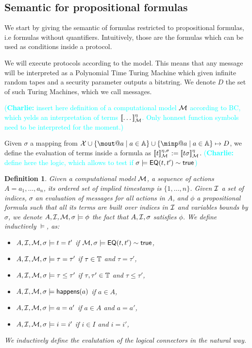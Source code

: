 \documentclass[a4paper]{article}
\newtheorem{definition}{Definition}
\theoremstyle{remark}
\newcommand{\charlie}[1]{\textcolor{cyan}{(\textbf{Charlie:} #1)}}
\begin{document}
\subsection{Semantic for propositional formulas}
We start by giving the semantic of formulas restricted to propositional formulas, i.e formulas without quantifiers. Intuitively, those are the formulas which can be used as conditions inside a protocol.

We will execute protocols according to the \BC model. This means that any message will be interpreted as a Polynomial Time Turing Machine which given infinite random tapes and a security parameter outputs a bitstring. We denote $D$ the set of such Turing Machines, which we call messages.

\charlie{insert here definition of a computational model $\mathcal{M}$ according to BC, which yelds an interpretation of terms $[\![\dots]\!]_{\mathcal{M}}^\eta$. Only honnest function symbols need to be interpreted for the moment.}

Given $\sigma$ a mapping from $\X \cup \{\mout@a \mid a \in \Actions \} \cup \{\minp@a \mid a \in \Actions \} \mapsto D$, we define the evaluation of terms inside a formula as $[\![t]\!]_{\mathcal{M}}^{\eta,\sigma} := [\![t\sigma]\!]_{\mathcal{M}}^\eta$.
\charlie{define here the \BC logic, which allows to test if $\sigma \models \textsf{EQ}(t,t') \sim \textsf{true}$}


\begin{definition}
  Given a computational model $\mathcal{M}$, a sequence of actions $A = a_1,\dots, a_n$, its ordered set of implied timestamp is $\{1,\dots,n\}$. Given $\mathcal{I}$ a set of indices, $\sigma$ an evaluation of messages for all actions in $A$, and $\phi$ a propositional formula such that all its terms are built over indices in $\mathcal{I}$ and variables bounds by $\sigma$, we denote $A,\mathcal{I},\mathcal{M},\sigma \models \phi$ the fact that $A,\mathcal{I},\sigma$ satisfies $\phi$. We define inductively $\models$, as:
  \begin{itemize}
  \item $A,\mathcal{I},\mathcal{M},\sigma \models t=t'$ if $\mathcal{M}, \sigma \models \textsf{EQ}(t,t') \sim \textsf{true}$,

  \item $A,\mathcal{I},\mathcal{M}, \sigma \models \tau = \tau' $ if $\tau \in \mathbb{T}$ and $\tau = \tau'$,

  \item $A,\mathcal{I},\mathcal{M}, \sigma \models \tau \leq \tau' $ if $\tau,\tau' \in \mathbb{T}$ and $\tau \leq \tau'$,

  \item $A,\mathcal{I},\mathcal{M}, \sigma \models \textsf{happens}(a)$ if $a \in A$,
  \item $A,\mathcal{I},\mathcal{M}, \sigma \models a=a'$ if $a \in A$ and $a=a'$,
  \item $A,\mathcal{I},\mathcal{M}, \sigma \models i=i'$ if $i \in I$ and  $i=i'$,

  \end{itemize}

  We inductively define the evalutation of the logical connectors in the natural way.
\end{definition}
\end{document}
